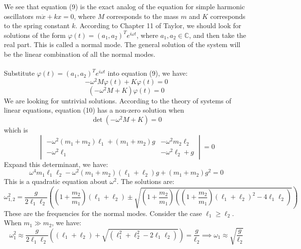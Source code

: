 \documentclass[11pt]{article}
\def\CC{{\mathbb C}}
\begin{document}
We see that equation (9) is the exact analog of the equation for simple harmonic oscillators \(m\ddot{x}+kx =0\), where
\(M\) corresponds to the mass \(m\) and \(K\) corresponds to the spring constant \(k\).
According to Chapter 11 of Taylor\cite{Taylor}, we should look for solutions of the form \(\varphi(t) = (a_1, a_2)^T e^{i\omega t}\),
where \(a_1, a_2\in \CC\), and then take the real part. This is called a normal mode. The general solution of the system will be the linear combination of all the normal modes.\\
\\
Substitute \(\varphi(t) = (a_1, a_2)^T e^{i\omega t}\) into equation (9), we have:
\begin{equation*}
  -\omega^2 M \varphi(t) + K\varphi(t) = 0
\end{equation*}
\begin{equation}
  (-\omega^2 M + K)\varphi(t) = 0
\end{equation}
We are looking for untrivial solutions. According to the theory of systems of linear equations, equation (10) has a non-zero solution
when
\begin{equation}
  \det(-\omega^2 M + K) = 0
\end{equation}
which is
\begin{equation*}
  \begin{vmatrix}
    -\omega^2 (m_1+m_2)\ell_1 + (m_1+m_2)g & -\omega^2 m_2\ell_2 \\
    -\omega^2 \ell_1 & -\omega^2 \ell_2 + g
  \end{vmatrix}
  = 0
\end{equation*}
Expand this determinant, we have:
\begin{equation*}
  \omega^4 m_1 \ell_1\ell_2 -  \omega^2 (m_1+m_2)(\ell_1+\ell_2)g  +(m_1+m_2)g^2  =0
\end{equation*}
This is a quadratic equation about \(\omega^2\). The solutions are:
\begin{equation}
  \omega^2_{1,2} = \frac{g }{2 \ell_1\ell_2 } \left((1+\frac{m_2}{m_1})(\ell_1+\ell_2) \pm \sqrt{(1+\frac{m_2}{m_1})((1+\frac{m_2}{m_1})(\ell_1+\ell_2)^2 - 4\ell_1\ell_2)}\right)
\end{equation}
These are the frequencies for the normal modes. Consider the case \(\ell_1\ge \ell_2\). When \(m_1\gg m_2\), we have:
\begin{equation*}
  \omega_1^2 \approx \frac{g}{2\ell_1\ell_2}((\ell_1+\ell_2) + \sqrt{(\ell_1^2+\ell_2^2 - 2\ell_1\ell_2 )}) = \frac{g}{\ell_2}
  \implies \omega_1 \approx \sqrt{\frac{g}{\ell_2}}
\end{equation*}
\end{document}
